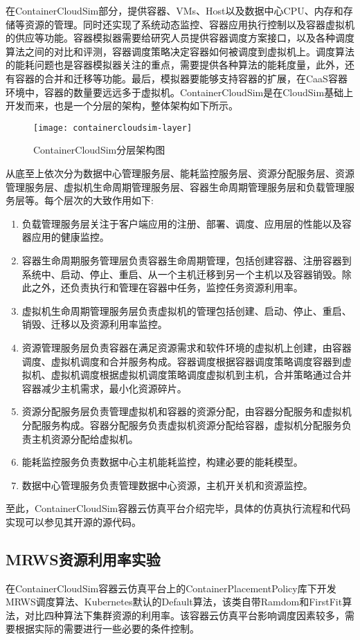 在ContainerCloudSim部分，提供容器、VMs、Host以及数据中心CPU、内存和存储等资源的管理。同时还实现了系统动态监控、容器应用执行控制以及容器虚拟机的供应等功能。容器模拟器需要给研究人员提供容器调度方案接口，以及各种调度算法之间的对比和评测，容器调度策略决定容器如何被调度到虚拟机上。调度算法的能耗问题也是容器模拟器关注的重点，需要提供各种算法的能耗度量，此外，还有容器的合并和迁移等功能。最后，模拟器要能够支持容器的扩展，在CaaS容器环境中，容器的数量要远远多于虚拟机。ContainerCloudSim是在CloudSim基础上开发而来，也是一个分层的架构，整体架构如下所示。
\begin{figure}[H] %
	\centering
	\texttt{[image: containercloudsim-layer]}
	\caption{ContainerCloudSim分层架构图}
\end{figure}
从底至上依次分为数据中心管理服务层、能耗监控服务层、资源分配服务层、资源管理服务层、虚拟机生命周期管理服务层、容器生命周期管理服务层和负载管理服务层等。每个层次的大致作用如下:
\begin{enumerate}
	\item 负载管理服务层关注于客户端应用的注册、部署、调度、应用层的性能以及容器应用的健康监控。
	\item 容器生命周期服务管理层负责容器生命周期管理，包括创建容器、注册容器到系统中、启动、停止、重启、从一个主机迁移到另一个主机以及容器销毁。除此之外，还负责执行和管理在容器中任务，监控任务资源利用率。
	\item 虚拟机生命周期管理服务层负责虚拟机的管理包括创建、启动、停止、重启、销毁、迁移以及资源利用率监控。
	\item 资源管理服务层负责容器在满足资源需求和软件环境的虚拟机上创建，由容器调度、虚拟机调度和合并服务构成。容器调度根据容器调度策略调度容器到虚拟机、虚拟机调度根据虚拟机调度策略调度虚拟机到主机，合并策略通过合并容器减少主机需求，最小化资源碎片。
	\item 资源分配服务层负责管理虚拟机和容器的资源分配，由容器分配服务和虚拟机分配服务构成。容器分配服务负责虚拟机资源分配给容器，虚拟机分配服务负责主机资源分配给虚拟机。
	\item 能耗监控服务负责数据中心主机能耗监控，构建必要的能耗模型。
	\item 数据中心管理服务负责管理数据中心资源，主机开关机和资源监控。
\end{enumerate}
至此，ContainerCloudSim容器云仿真平台介绍完毕，具体的仿真执行流程和代码实现可以参见其开源的源代码。

\subsection{MRWS资源利用率实验}
在ContainerCloudSim容器云仿真平台上的ContainerPlacementPolicy库下开发MRWS调度算法、Kubernetes默认的Default算法，该类自带Ramdom和FirstFit算法，对比四种算法下集群资源的利用率。该容器云仿真平台影响调度因素较多，需要根据实际的需要进行一些必要的条件控制。

